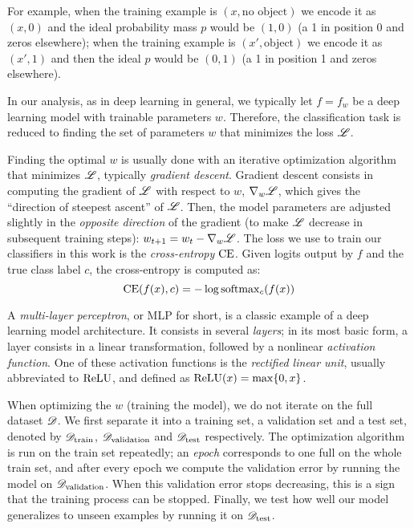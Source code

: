 \documentclass[../main.tex]{subfiles}
\begin{document}
For example, when the training example is $(x, \text{no object})$ we encode it as $(x, 0)$ and the ideal probability mass $p$
would be $(1, 0)$ (a 1 in position 0 and zeros elsewhere);
when the training example is $(x', \text{object})$ we encode it as $(x', 1)$ and then the ideal $p$ would be $(0, 1)$ (a 1
in position 1 and zeros elsewhere).

In our analysis, as in deep learning in general, we typically let $f = f_w$ be a deep learning model with trainable parameters $w$.
Therefore, the classification task is reduced to finding the set of parameters $w$ that minimizes
the loss $\mathscr{L}$.

Finding the optimal $w$ is usually done with an iterative optimization algorithm that minimizes $\mathscr{L}$, typically \emph{gradient descent}.
Gradient descent consists in computing the gradient of $\mathscr{L}$ with respect to $w$, $\nabla_{w} \mathscr{L}$, which gives the ``direction of steepest ascent'' of $\mathscr{L}$.
Then, the model parameters are adjusted slightly in the \emph{opposite direction} of the gradient (to make $\mathscr{L}$ decrease in subsequent training steps): $w_{t+1} = w_t - \nabla_w \mathscr{L}$.
The loss we use to train our classifiers in this work is the \emph{cross-entropy} $\text{CE}$.
Given logits output by $f$ and the true class label $c$, the cross-entropy is computed as:
\begin{equation}
\text{CE}(f(x), c) = - \log \mathrm{softmax}_c(f(x))
\end{equation}

A \emph{multi-layer perceptron}, or MLP for short, is a classic example of a deep learning model architecture.
It consists in several \emph{layers}; in its most basic form, a layer consists in a linear transformation,
followed by a nonlinear \emph{activation function}.
One of these activation functions is the \emph{rectified linear unit}, usually abbreviated to $\text{ReLU}$, and defined as $\text{ReLU}(x) = \max\{0, x\}$.

When optimizing the $w$ (training the model), we do not iterate on the full dataset $\mathscr{D}$.
We first separate it into a training set, a validation set and a test set, denoted by $\mathscr{D}_\text{train}$, $\mathscr{D}_\text{validation}$ and $\mathscr{D}_\text{test}$ respectively.
The optimization algorithm is run on the train set repeatedly;
an \emph{epoch} corresponds to one full on the whole train set, and after every epoch we compute the validation error by running the model on $\mathscr{D}_\text{validation}$.
When this validation error stops decreasing, this is a sign that the training process can be stopped.
Finally, we test how well our model generalizes to unseen examples by running it on $\mathscr{D}_\text{test}$.
\end{document}
